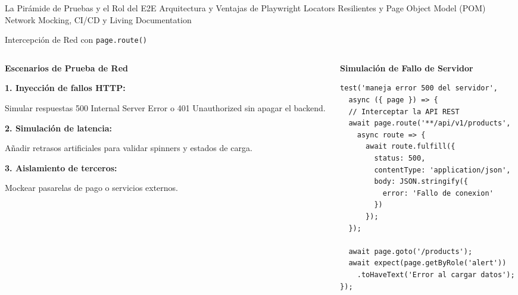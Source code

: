 \documentclass[aspectratio=169]{beamer}
\begin{document}
  {La Pirámide de Pruebas y el Rol del E2E}
  {Arquitectura y Ventajas de Playwright}
  {Locators Resilientes y Page Object Model (POM)}
  {Network Mocking, CI/CD y Living Documentation}


\begin{frame}[fragile]{Intercepción de Red con \texttt{page.route()}}
  \begin{columns}[T,onlytextwidth]
    \begin{column}{0.48\textwidth}
      \begin{tcolorbox}[colback=cbWhite,colframe=cbBorder,arc=4pt,top=5pt,bottom=5pt,left=5pt,right=5pt]
        {\footnotesize\bfseries\color{cbBlue} Escenarios de Prueba de Red}\par
        \vspace{0.1cm}
        {\scriptsize
        \textbf{1. Inyección de fallos HTTP:}\par
        Simular respuestas 500 Internal Server Error o 401 Unauthorized sin apagar el backend.\par\vspace{0.1cm}
        \textbf{2. Simulación de latencia:}\par
        Añadir retrasos artificiales para validar spinners y estados de carga.\par\vspace{0.1cm}
        \textbf{3. Aislamiento de terceros:}\par
        Mockear pasarelas de pago o servicios externos.\par
        }
      \end{tcolorbox}
    \end{column}
    \begin{column}{0.50\textwidth}
      \textbf{\scriptsize\color{cbDark} Simulación de Fallo de Servidor}
      \begin{lstlisting}[style=tslst]
test('maneja error 500 del servidor', 
  async ({ page }) => {
  // Interceptar la API REST
  await page.route('**/api/v1/products', 
    async route => {
      await route.fulfill({
        status: 500,
        contentType: 'application/json',
        body: JSON.stringify({ 
          error: 'Fallo de conexion' 
        })
      });
  });

  await page.goto('/products');
  await expect(page.getByRole('alert'))
    .toHaveText('Error al cargar datos');
});
      \end{lstlisting}
    \end{column}
  \end{columns}
\end{frame}
\end{document}
